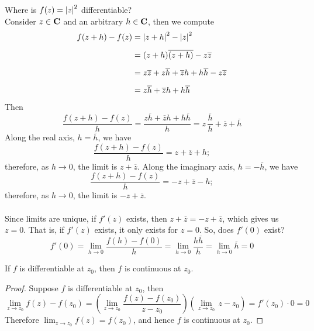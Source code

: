 \vspace*{1em}

\begin{example}\label{normdiffexistence}
Where is $f(z) = \left\lvert z\right\rvert^2$ differentiable?\\[1em]
Consider $z \in \mathbf C$ and an arbitrary $h \in \mathbf C$, then we compute
\begin{align*}
f(z + h) - f(z) &= \left\lvert z + h\right\rvert^2 - \left\lvert z\right\rvert^2\\[0.5em]
&= (z + h)\overline{(z + h)} - z\overline{z}\\[0.5em]
&= z\overline{z} + z\overline{h} + \overline{z}h + h\overline{h} - z\overline{z}\\[0.5em]
&= z\overline{h} + \overline{z}h + h\overline{h}
\end{align*}
Then 
\[\frac{f(z + h) - f(z)}{h} = \frac{z\overline{h} + \overline{z}h + h\overline{h}}{h} = z\,\frac{\overline{h}}{h} + \overline{z} + \overline{h}\]
Along the real axis, $h = \overline{h}$, we have
\[\frac{f(z + h) - f(z)}{h} = z + \overline{z} + h;\]
therefore, as $h \to 0$, the limit is $z + \overline{z}$. Along the imaginary axis, $h = -\overline{h}$, we have
\[\frac{f(z + h) - f(z)}{h} = -z + \overline{z} - h;\]
therefore, as $h \to 0$, the limit is $-z + \overline{z}$.\\
\\
Since limits are unique, if $f'(z)$ exists, then $z + \overline{z} = -z + \overline{z}$, which gives us $z = 0$. That is, if $f'(z)$ exists, it only exists for $z = 0$. So, does $f'(0)$ exist?
\[f'(0) = \lim_{h \to 0}\frac{f(h) - f(0)}{h} = \lim_{h \to 0}\frac{h\overline{h}}{h} = \lim_{h \to 0}\overline{h} = 0\]
\end{example}

\vspace*{1em}

\begin{proposition}
If $f$ is differentiable at $z_0$, then $f$ is continuous at $z_0$.
\end{proposition}
\begin{proof}
Suppose $f$ is differentiable at $z_0$, then
\[\lim_{z \to z_0}f(z) - f(z_0) = \left(\lim_{z \to z_0}\frac{f(z) - f(z_0)}{z - z_0}\right)\left(\lim_{z \to z_0}\,z - z_0\right) = f'(z_0)\cdot 0 = 0\]
Therefore $\lim_{z \to z_0}f(z) = f(z_0)$, and hence $f$ is continuous at $z_0$.
\end{proof}

\vspace*{1em}

